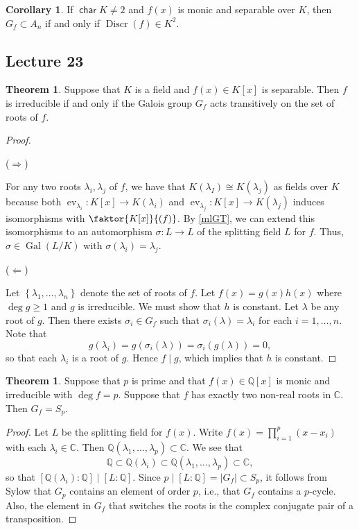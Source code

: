 \documentclass[10pt,letterpaper,cm]{nupset}
\theoremstyle{definition}
\theoremstyle{theorem}
\newtheorem{theorem}[definition]{Theorem}
\newtheorem{corollary}[definition]{Corollary}
\theoremstyle{remark}
\newcommand{\C}{\mathbb C}
\newcommand{\Q}{\mathbb Q}
\newcommand{\1}{\mathbf{1}}
\newcommand{\0}{\vec 0}
\DeclareMathOperator{\Char}{\mathsf{char}}
\DeclareMathOperator{\gal}{Gal}
\DeclareMathOperator{\ev}{ev}
\DeclareMathOperator{\disc}{Discr}
\begin{document}
\begin{corollary}
If $\Char{K} \ne 2$ and $f(x)$ is monic and separable over $K$, then $G_f \subset A_n$ if and only if $\disc(f) \in K^2$. 
\end{corollary}

\subsection{Lecture 23}

\begin{theorem}
Suppose that $K$ is a field and $f(x) \in K[x]$ is separable. Then $f$ is irreducible if and only if the Galois group $G_f$ acts transitively on the set of roots of $f$.  
\end{theorem}
\begin{proof} $ $

 ($\Longrightarrow$) 
 
 For any two roots $\lambda_i, \lambda_j$ of $f$, we have that $K(\lambda_I) \cong K(\lambda_j)$ as fields over $K$ because both $\ev_{\lambda_i} : K[x] \to K(\lambda_i)$ and $\ev_{\lambda_j} : K[x] \to K(\lambda_j)$ induces isomorphisms with $\faktor{K[x]}{(f)}$. By \cref{mlGT}, we can extend this isomorphisms to an automorphism $\sigma : L \to L$ of the splitting field $L$ for $f$. Thus, $\sigma \in \gal(L/K)$ with $\sigma(\lambda_i) = \lambda_j$. 

\medskip


($\Longleftarrow$) 

Let $\left\{\lambda_1, \ldots, \lambda_n\right\}$ denote the set of roots of $f$. Let $f(x) = g(x)h(x)$ where $\deg{g} \geq 1$ and $g$ is irreducible. We must show that $h$ is constant. Let $\lambda$ be any root of $g$. Then there exists $\sigma_i \in G_f$ such that $\sigma_i(\lambda) = \lambda_i$ for each $i=1, \ldots, n$. Note that $$g(\lambda_i) = g(\sigma_i(\lambda))= \sigma_i(g(\lambda)) =0,$$ so that each $\lambda_i$ is a root of $g$. Hence $f \mid g$, which implies that $h$ is constant. 
\end{proof}

\begin{theorem}
Suppose that $p$ is prime and that $f(x) \in \Q[x]$ is monic and irreducible with $\deg{f} =p$. Suppose that $f$ has exactly two non-real roots in $\C$. Then $G_f = S_p$.
\end{theorem}
\begin{proof}
Let $L$ be the splitting field for $f(x)$. Write $f(x) = \prod_{i=1}^p(x- x_i)$ with each $\lambda_i \in \C$. Then $\Q(\lambda_1, \ldots, \lambda_p) \subset \C$. We see that $$ \Q \subset \Q(\lambda_i)  \subset \Q(\lambda_1, \ldots, \lambda_p) \subset \C,$$ so that $\left[\Q(\lambda_i) : \Q\right] \mid \left[L : \Q\right]$.  Since $p \mid \left[L: \Q\right] = \left\lvert{G_f}\right\rvert \subset S_p$, it follows from Sylow that $G_p$ contains an element of order $p$, i.e., that $G_f$ contains a $p$-cycle. Also, the element in $G_f$ that switches the roots is the complex conjugate pair of a transposition.
\end{proof}
\end{document}
